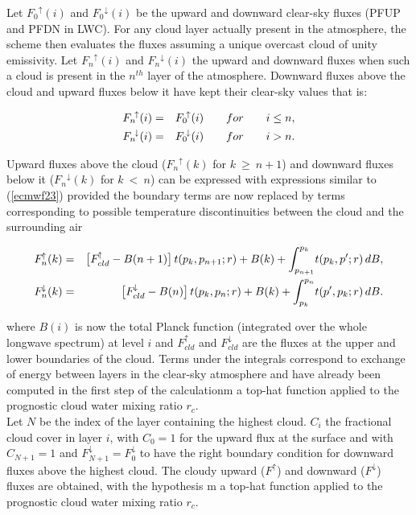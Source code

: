 Let $F_0{^{\!\uparrow}}(i)$ and $F_0{^{\!\downarrow}}(i)$ be the upward and downward clear-sky fluxes (PFUP and PFDN in LWC). For any cloud layer actually present in the atmosphere, the scheme then evaluates the fluxes assuming a unique overcast cloud of unity emissivity. Let $F_n{^{\!\uparrow}}(i)$ and $F_n{^{\!\downarrow}}(i)$ the upward and downward fluxes when such a cloud is present in the $n^{th}$ layer of the atmosphere. Downward fluxes above the cloud and upward fluxes below it have kept their clear-sky values that is:

\medskip
\begin{eqnarray}\label{ecmwf29}
F_n{^{\!\uparrow}}(i) &=& F_0{^{\!\uparrow}}(i) \qquad for \qquad i \leq n, \cr
F_n{^{\!\downarrow}}(i) &=& F_0{^{\!\downarrow}}(i) \qquad for \qquad i > n.
\end{eqnarray}
\medskip

Upward fluxes above the cloud ($F_n{^{\!\uparrow}}(k)$ for $k~\geq~n+1$) and downward fluxes below it ($F_n{^{\!\downarrow}}(k)$ for $k~<~n$) can be expressed with expressions similar to (\ref{ecmwf23}) provided the boundary terms are now replaced by terms corresponding to possible temperature discontinuities between the cloud and the surrounding air

\medskip
\begin{eqnarray}\label{ecmwf210}
F_{n}^{\!\uparrow}(k) &=& \bigl[F_{cld}^{\!\uparrow} - B(n+1)\bigr] \, t(p_k,p_{n+1};r) + B(k) + \int_{p_{n+1}}^{p_k}\!{t(p_k,p';r) \, dB}, \cr
F_{n}^{\!\downarrow}(k) &=& \bigl[F_{cld}^{\!\downarrow} - B(n)\bigr] \, t(p_k,p_n;r) + B(k) + \int_{p_{k}}^{p_n}\!{t(p',p_k;r) \, dB}.
\end{eqnarray}
\medskip

\noindent where $B(i)$ is now the total Planck function (integrated over the whole
longwave spectrum) at level $i$ and $F_{cld}^{\!\uparrow}$ and
$F_{cld}^{\!\downarrow}$ are the fluxes at the upper and lower
boundaries of the cloud.  Terms under the integrals correspond to
exchange of energy between layers in the clear-sky atmosphere and have
already been computed in the first step of the calculationm a
top-hat function applied to the prognostic cloud water mixing ratio $r_c$.\\

Let $N$ be the index of the layer containing the highest cloud.  $C_i$
the fractional cloud cover in layer $i$, with $C_0 = 1$ for the upward
flux at the surface and with $C_{N+1} = 1$ and $F_{N+1}^{\!\downarrow}
= F_0^{\!\downarrow}$ to have the right boundary condition for downward
fluxes above the highest cloud.  The cloudy upward ($F^{\!\uparrow}$)
and downward ($F^{\!\downarrow}$) fluxes are obtained, with the hypothesis
m a
top-hat function applied to the prognostic cloud water mixing ratio $r_c$.\\

